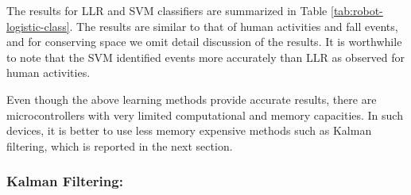 \documentclass{IEEEtran}
\begin{document}
The results for LLR and SVM classifiers are summarized in Table \ref{tab:robot-logistic-class}. The results are similar to that of human activities and fall events, and for 
conserving space we omit detail discussion of the results. It is worthwhile to note that the SVM 
 identified events more accurately than LLR as observed for human activities.  





Even though the above learning methods provide accurate results, there are microcontrollers with 
very limited computational and memory capacities. In such devices, it is better to use less memory 
expensive methods such as Kalman filtering, which is reported in the next section.

\subsubsection{Kalman Filtering:}
\end{document}
